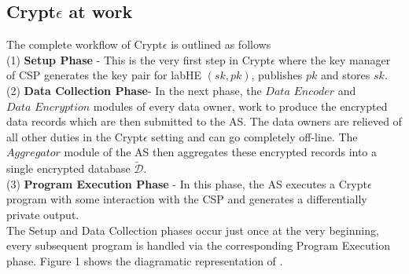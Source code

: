 \subsection{Crypt$\epsilon$ at work}
The complete workflow of Crypt$\epsilon$ is outlined as follows\\(1) \textbf{ \textsf{Setup Phase}} - This is the very first step in Crypt$\epsilon$ where the key manager of \textsf{CSP} generates the key pair for labHE $(sk,pk)$, publishes $pk$ and stores $sk$. \\(2) \textbf{ \textsf{Data Collection Phase}}- In the next phase, the $\textit{Data 
Encoder}$ and $\textit{Data Encryption}$ modules of every data owner, work to produce the encrypted data records which are then submitted to the \textsf{AS}. The data owners are relieved of all other duties in the Crypt$\epsilon$ setting and can go completely off-line. The $\textit{Aggregator}$ module of the \textsf{AS} then aggregates these encrypted records into a single encrypted database $\boldsymbol{\tilde{\mathcal{D}}}$. \\(3) \textbf{ \textsf{ Program Execution Phase}} - In this phase, the \textsf{AS} executes a Crypt$\epsilon$ program with some interaction with the \textsf{CSP}  and generates a differentially private output.  \\
The \textsf{Setup} and \textsf{Data Collection} phases occur just once at the very beginning, every subsequent program  is handled via the corresponding  \textsf{Program Execution} phase. Figure 1 shows the diagramatic representation of \system.
